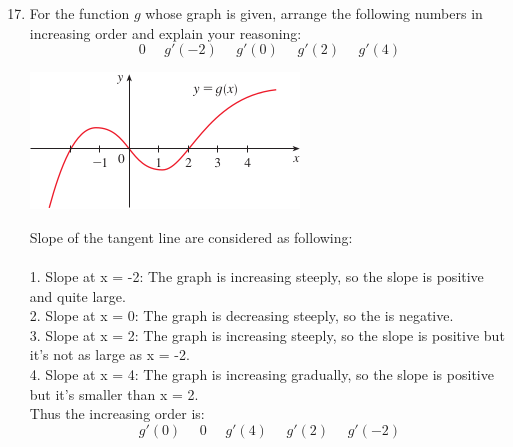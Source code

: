 \documentclass[12pt]{article}
\begin{document}
\begin{enumerate}
    \setcounter{enumi}{16}
    \item For the function $g$ whose graph is given, arrange the following numbers in increasing order and explain your reasoning:
          \[0 \text{ ~~  } g'(-2) \text{  ~~ } g'(0) \text{  ~~ } g'(2) \text{ ~~  } g'(4)\]

          \begin{center}
              \includegraphics{Images/Image-0.png}
          \end{center}
          Slope of the tangent line are considered as following:\\~\\
          1. Slope at x = -2: The graph is increasing steeply, so the slope is positive and quite large.\\
          2. Slope at x = 0: The graph is decreasing steeply, so the is negative.\\
          3. Slope at x = 2: The graph is increasing steeply, so the slope is positive but it's not as large as x = -2.\\
          4. Slope at x = 4: The graph is increasing gradually, so the slope is positive but it's smaller than x = 2.\\

          Thus the increasing order is:
          \[\boxed{g'(0) \text{ ~~ } 0 \text{ ~~ } g'(4) \text{ ~~ } g'(2) \text{ ~~ } g'(-2)}\]

\end{enumerate}
\end{document}
